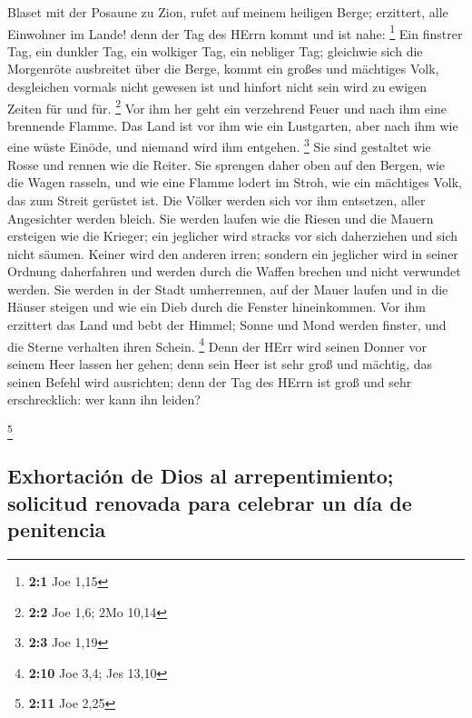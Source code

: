  Blaset mit der Posaune zu Zion, rufet auf meinem heiligen
Berge; erzittert, alle Einwohner im Lande! denn der Tag des HErrn kommt
und ist nahe: \footnote{\textbf{2:1} Joe 1,15}  Ein
finstrer Tag, ein dunkler Tag, ein wolkiger Tag, ein nebliger Tag;
gleichwie sich die Morgenröte ausbreitet über die Berge, kommt ein
großes und mächtiges Volk, desgleichen vormals nicht gewesen ist und
hinfort nicht sein wird zu ewigen Zeiten für und für. \footnote{\textbf{2:2}
  Joe 1,6; 2Mo 10,14}  Vor ihm her geht ein verzehrend
Feuer und nach ihm eine brennende Flamme. Das Land ist vor ihm wie ein
Lustgarten, aber nach ihm wie eine wüste Einöde, und niemand wird ihm
entgehen. \footnote{\textbf{2:3} Joe 1,19}  Sie sind
gestaltet wie Rosse und rennen wie die Reiter.  Sie
sprengen daher oben auf den Bergen, wie die Wagen rasseln, und wie eine
Flamme lodert im Stroh, wie ein mächtiges Volk, das zum Streit gerüstet
ist.  Die Völker werden sich vor ihm entsetzen, aller
Angesichter werden bleich.  Sie werden laufen wie die
Riesen und die Mauern ersteigen wie die Krieger; ein jeglicher wird
stracks vor sich daherziehen und sich nicht säumen. 
Keiner wird den anderen irren; sondern ein jeglicher wird in seiner
Ordnung daherfahren und werden durch die Waffen brechen und nicht
verwundet werden.  Sie werden in der Stadt umherrennen,
auf der Mauer laufen und in die Häuser steigen und wie ein Dieb durch
die Fenster hineinkommen.  Vor ihm erzittert das Land und
bebt der Himmel; Sonne und Mond werden finster, und die Sterne verhalten
ihren Schein. \footnote{\textbf{2:10} Joe 3,4; Jes 13,10}
 Denn der HErr wird seinen Donner vor seinem Heer lassen
her gehen; denn sein Heer ist sehr groß und mächtig, das seinen Befehl
wird ausrichten; denn der Tag des HErrn ist groß und sehr erschrecklich:
wer kann ihn leiden?

\footnote{\textbf{2:11} Joe 2,25}

\hypertarget{exhortaciuxf3n-de-dios-al-arrepentimiento-solicitud-renovada-para-celebrar-un-duxeda-de-penitencia}{%
\subsection{Exhortación de Dios al arrepentimiento; solicitud renovada
para celebrar un día de
penitencia}\label{exhortaciuxf3n-de-dios-al-arrepentimiento-solicitud-renovada-para-celebrar-un-duxeda-de-penitencia}}

